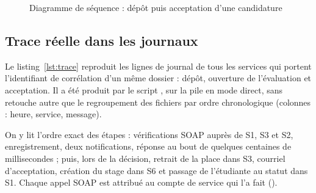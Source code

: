 \begin{figure}[H]
\caption{Diagramme de séquence : dépôt puis acceptation d'une candidature}\label{fig:sequence}
\end{figure}

\subsection{Trace réelle dans les journaux}

Le listing~\ref{lst:trace} reproduit les lignes de journal de tous les services qui portent l'identifiant de corrélation d'un même dossier : dépôt, ouverture de l'évaluation et acceptation. Il a été produit par le script , sur la pile en mode direct, sans retouche autre que le regroupement des fichiers par ordre chronologique (colonnes : heure, service, message).



On y lit l'ordre exact des étapes : vérifications SOAP auprès de S1, S3 et S2, enregistrement, deux notifications, réponse  au bout de quelques centaines de millisecondes ; puis, lors de la décision, retrait de la place dans S3, courriel d'acceptation, création du stage dans S6 et passage de l'étudiante au statut  dans S1. Chaque appel SOAP est attribué au compte de service qui l'a fait ().

